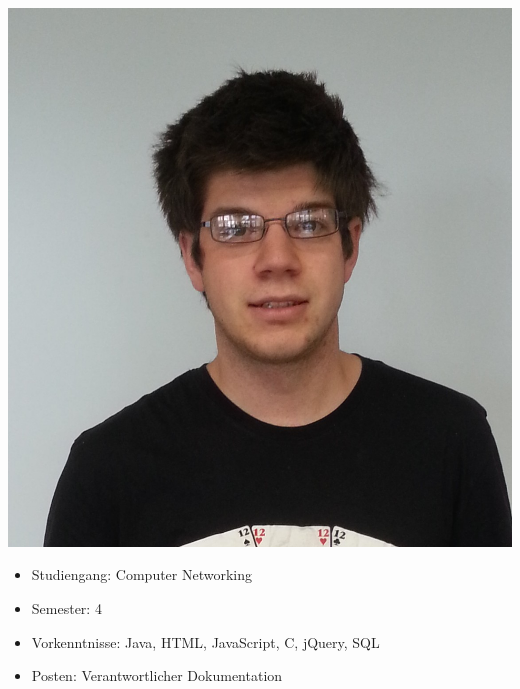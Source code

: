 \begin{minipage}{0.28\textwidth} 
\includegraphics[width=\textwidth]{content/pictures/Gruppenbilder/Marcel.jpg}
\end{minipage}%
\begin{minipage}{0.7\textwidth}
\begin{itemize}
   \item Studiengang: Computer Networking
  \item Semester: 4
  \item Vorkenntnisse: Java, HTML, JavaScript, C, jQuery, SQL
  \item Posten: Verantwortlicher Dokumentation
\end{itemize}
\end{minipage}
